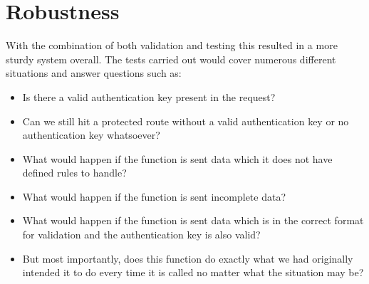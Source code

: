 \section{Robustness}
	With the combination of both validation and testing this resulted in a more sturdy system overall. The tests carried out would cover numerous different situations and answer questions such as:
    \begin{itemize}
    \item Is there a valid authentication key present in the request?
    \item Can we still hit a protected route without a valid authentication key or no authentication key whatsoever? 
    \item What would happen if the function is sent data which it does not have defined rules to handle?
    \item What would happen if the function is sent incomplete data?
    \item  What would happen if the function is sent data which is in the correct format for validation and the authentication key is also valid?
    \item  But most importantly, does this function do exactly what we had originally intended it to do every time it is called no matter what the situation may be?
    \end{itemize}
    
    